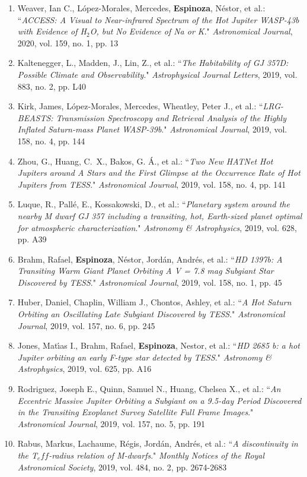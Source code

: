 \documentclass[12pt, a4paper]{article} %
\begin{document}
\begin{flushleft}
\begin{enumerate}
\item Weaver, Ian C., López-Morales, Mercedes, \textbf{Espinoza}, Néstor, et al.: ``\textit{ACCESS: A Visual to Near-infrared Spectrum of the Hot Jupiter WASP-43b with Evidence of H$_2$O, but No Evidence of Na or K}." \textit{Astronomical Journal}, 2020, vol. 159, no. 1, pp. 13
\item Kaltenegger, L., Madden, J., Lin, Z., et al.: ``\textit{The Habitability of GJ 357D: Possible Climate and Observability}." \textit{Astrophysical Journal Letters}, 2019, vol. 883, no. 2, pp. L40
\item Kirk, James, López-Morales, Mercedes, Wheatley, Peter J., et al.: ``\textit{LRG-BEASTS: Transmission Spectroscopy and Retrieval Analysis of the Highly Inflated Saturn-mass Planet WASP-39b}." \textit{Astronomical Journal}, 2019, vol. 158, no. 4, pp. 144
\item Zhou, G., Huang, C.~X., Bakos, G. Á., et al.: ``\textit{Two New HATNet Hot Jupiters around A Stars and the First Glimpse at the Occurrence Rate of Hot Jupiters from TESS}." \textit{Astronomical Journal}, 2019, vol. 158, no. 4, pp. 141
\item Luque, R., Pallé, E., Kossakowski, D., et al.: ``\textit{Planetary system around the nearby M dwarf GJ 357 including a transiting, hot, Earth-sized planet optimal for atmospheric characterization}." \textit{Astronomy \& Astrophysics}, 2019, vol. 628, pp. A39
\item Brahm, Rafael, \textbf{Espinoza}, Néstor, Jordán, Andrés, et al.: ``\textit{HD 1397b: A Transiting Warm Giant Planet Orbiting A V = 7.8 mag Subgiant Star Discovered by TESS}." \textit{Astronomical Journal}, 2019, vol. 158, no. 1, pp. 45
\item Huber, Daniel, Chaplin, William J., Chontos, Ashley, et al.: ``\textit{A Hot Saturn Orbiting an Oscillating Late Subgiant Discovered by TESS}." \textit{Astronomical Journal}, 2019, vol. 157, no. 6, pp. 245
\item Jones, Matı́as I., Brahm, Rafael, \textbf{Espinoza}, Nestor, et al.: ``\textit{HD 2685 b: a hot Jupiter orbiting an early F-type star detected by TESS}." \textit{Astronomy \& Astrophysics}, 2019, vol. 625, pp. A16
\item Rodriguez, Joseph E., Quinn, Samuel N., Huang, Chelsea X., et al.: ``\textit{An Eccentric Massive Jupiter Orbiting a Subgiant on a 9.5-day Period Discovered in the Transiting Exoplanet Survey Satellite Full Frame Images}." \textit{Astronomical Journal}, 2019, vol. 157, no. 5, pp. 191
\item Rabus, Markus, Lachaume, Régis, Jordán, Andrés, et al.: ``\textit{A discontinuity in the T$_eff$-radius relation of M-dwarfs}." \textit{Monthly Notices of the Royal Astronomical Society}, 2019, vol. 484, no. 2, pp. 2674-2683

\end{enumerate}
\end{flushleft}
\end{document}
